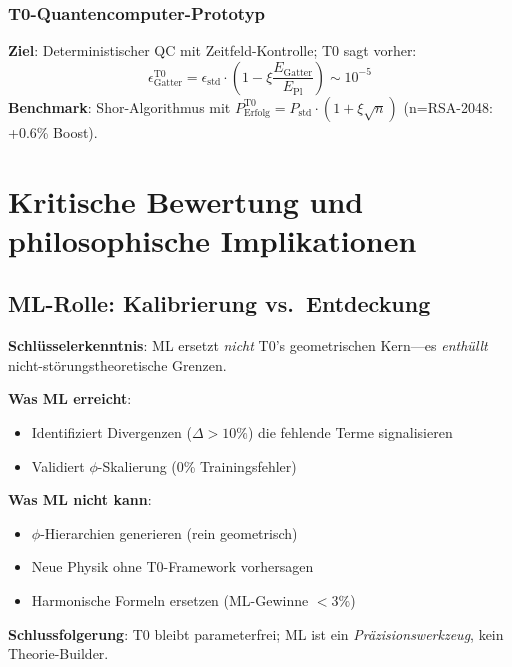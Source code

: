 	\subsubsection{T0-Quantencomputer-Prototyp}
	
	\textbf{Ziel}: Deterministischer QC mit Zeitfeld-Kontrolle; T0 sagt vorher:
	\begin{equation}
		\epsilon_{\text{Gatter}}^{\text{T0}} = \epsilon_{\text{std}} \cdot \left(1 - \xi \frac{E_{\text{Gatter}}}{E_{\text{Pl}}}\right) \sim 10^{-5} \tag{T0-Orig Gl.~5.2.1}
	\end{equation}
	\textbf{Benchmark}: Shor-Algorithmus mit $P_{\text{Erfolg}}^{\text{T0}} = P_{\text{std}} \cdot (1 + \xi\sqrt{n})$ (n=RSA-2048: +0.6\% Boost).
	
	\section{Kritische Bewertung und philosophische Implikationen}
	
	\subsection{ML-Rolle: Kalibrierung vs.~Entdeckung}
	
	\textbf{Schlüsselerkenntnis}: ML ersetzt \textit{nicht} T0's geometrischen Kern—es \textit{enthüllt} nicht-störungstheoretische Grenzen.
	
	\begin{tcolorbox}[colback=red!5!white,colframe=red!75!black,title={ML-Grenzen in T0}]
		\textbf{Was ML erreicht}:
		\begin{itemize}
			\item Identifiziert Divergenzen ($\Delta>10\%$) die fehlende Terme signalisieren
			\item Validiert $\phi$-Skalierung (0\% Trainingsfehler)
		\end{itemize}
		\textbf{Was ML nicht kann}:
		\begin{itemize}
			\item $\phi$-Hierarchien generieren (rein geometrisch)
			\item Neue Physik ohne T0-Framework vorhersagen
			\item Harmonische Formeln ersetzen (ML-Gewinne $<3\%$)
		\end{itemize}
	\end{tcolorbox}
	
	\textbf{Schlussfolgerung}: T0 bleibt parameterfrei; ML ist ein \textit{Präzisionswerkzeug}, kein Theorie-Builder.
	
